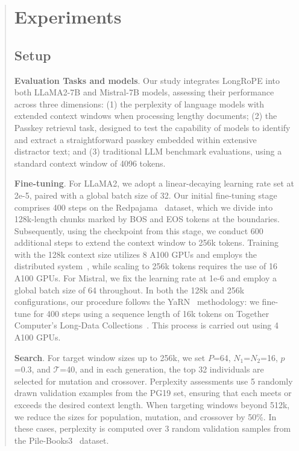 \begin{abstract}
 \section{Experiments}

\label{sec:exp}
\subsection{Setup}
\textbf{Evaluation Tasks and models}. Our study integrates LongRoPE into both LLaMA2-7B and Mistral-7B models, assessing their performance across three dimensions: (1) the perplexity of language models with extended context windows when processing lengthy documents; (2) the Passkey retrieval task, designed to test the capability of models to identify and extract a straightforward passkey embedded within extensive distractor text; and (3) traditional LLM benchmark evaluations, using a standard context window of 4096 tokens.

\textbf{Fine-tuning}. For LLaMA2, we adopt a linear-decaying learning rate set at 2e-5, paired with a global batch size of 32. Our initial fine-tuning stage comprises 400 steps on the Redpajama~\cite{redpajama} dataset, which we divide into 128k-length chunks marked by BOS and EOS tokens at the boundaries. Subsequently, using the checkpoint from this stage, we conduct 600 additional steps to extend the context window to 256k tokens. Training with the 128k context size utilizes 8 A100 GPUs and employs the distributed system~\cite{cube}, while scaling to 256k tokens requires the use of 16 A100 GPUs. For Mistral, we fix the learning rate at 1e-6 and employ a global batch size of 64 throughout. In both the 128k and 256k configurations, our procedure follows the YaRN~\cite{yarn} methodology: we fine-tune for 400 steps using a sequence length of 16k tokens on Together Computer's Long-Data Collections~\cite{mistraldata}. This process is carried out using 4 A100 GPUs.

\textbf{Search}. For target window sizes up to 256k, we set $P$=64, $N_1$=$N_2$=16, $p$=0.3, and $\mathcal{T}$=40, and in each generation, the top 32 individuals are selected for mutation and crossover. Perplexity assessments use 5 randomly drawn validation examples from the PG19 set, ensuring that each meets or exceeds the desired context length. When targeting windows beyond 512k, we reduce the sizes for population, mutation, and crossover by 50\%. In these cases, perplexity is computed over 3 random validation samples from the Pile-Books3~\cite{pile} dataset.


\end{abstract}
